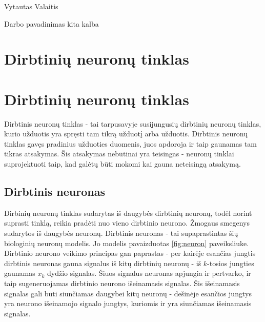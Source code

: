 \documentclass[a4paper,12pt,fleqn]{article}
\begin{document}
 {}{}{}{}%
 {Vytautas Valaitis}

\tableofcontents



\bothabstracts{}%
{Darbo pavadinimas kita kalba} %
{}%






\newpage
\section{Dirbtinių neuronų tinklas}

\section{Dirbtinių neuronų tinklas}

Dirbtinis neuronų tinklas - tai tarpusavyje susijungusių dirbtinių neuronų tinklas, kurio užduotis yra spręsti tam tikrą užduotį arba užduotis.
Dirbtinis neuronų tinklas gavęs pradinius užduoties duomenis, juos apdoroja ir taip gaunamas tam tikras atsakymas.
Šis atsakymas nebūtinai yra teisingas - neuronų tinklai suprojektuoti taip, kad galėtų būti mokomi kai gauna neteisingą atsakymą.

\subsection{Dirbtinis neuronas}

Dirbinių neuronų tinklas sudarytas iš daugybės dirbtinių neuronų, todėl norint suprasti tinklą, reikia pradėti nuo vieno dirbtinio neurono.
Žmogaus smegenys sudarytos iš daugybės neuronų.
Dirbtinis neuronas - tai supaprastintas šių biologinių neuronų modelis.
Jo modelis pavaizduotas \ref{fig:neuron} paveiksliuke.
Dirbtinio neurono veikimo principas gan paprastas - per kairėje esančias jungtis dirbtinis neuronas gauna signalus iš kitų dirbtinių neuronų - iš $k$-tosios jungties gaunamas $x_k$ dydžio signalas.
Šiuos signalus neuronas apjungia ir pertvarko, ir taip sugeneruojamas dirbtinio neurono išeinamasis signalas.
Šis išeinamasis signalas gali būti siunčiamas daugybei kitų neuronų - dešinėje esančios jungtys yra neurono išeinamojo signalo jungtys, kuriomis ir yra siunčiamas išeinamasis signalas.
\end{document}
